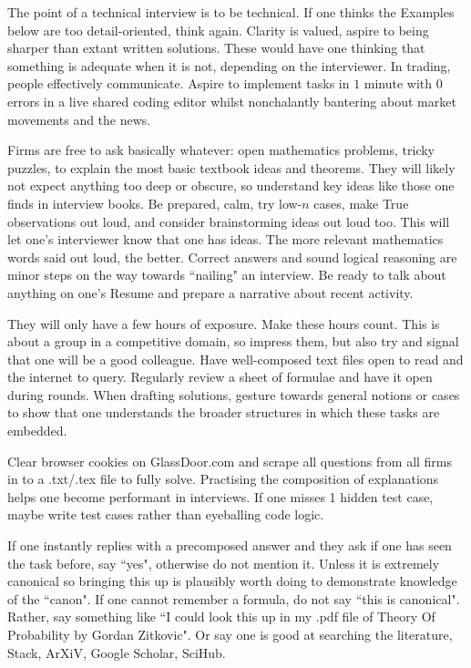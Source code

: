 The point of a technical interview is to be technical. If one thinks the Examples below are too detail-oriented, think again. Clarity is valued, aspire to being sharper than extant written solutions. These would have one thinking that something is adequate when it is not, depending on the interviewer. In trading, people effectively communicate. Aspire to implement tasks in $1$ minute with $0$ errors in a live shared coding editor whilst nonchalantly bantering about market movements and the news.

Firms are free to ask basically whatever: open mathematics problems, tricky puzzles, to explain the most basic textbook ideas and theorems. They will likely not expect anything too deep or obscure, so understand key ideas like those one finds in interview books. Be prepared, calm, try low-$n$ cases, make True observations out loud, and consider brainstorming ideas out loud too. This will let one's interviewer know that one has ideas. The more relevant mathematics words said out loud, the better. Correct answers and sound logical reasoning are minor steps on the way towards ``nailing" an interview. Be ready to talk about anything on one's Resume and prepare a narrative about recent activity.

They will only have a few hours of exposure. Make these hours count. This is about a group in a competitive domain, so impress them, but also try and signal that one will be a good colleague. Have well-composed text files open to read and the internet to query. Regularly review a sheet of formulae and have it open during rounds. When drafting solutions, gesture towards general notions or cases to show that one understands the broader structures in which these tasks are embedded.

Clear browser cookies on GlassDoor.com and scrape all questions from all firms in to a .txt/.tex file to fully solve. Practising the composition of explanations helps one become performant in interviews. If one misses 1 hidden test case, maybe write test cases rather than eyeballing code logic.

If one instantly replies with a precomposed answer and they ask if one has seen the task before, say ``yes", otherwise do not mention it. Unless it is extremely canonical so bringing this up is plausibly worth doing to demonstrate knowledge of the ``canon". If one cannot remember a formula, do not say ``this is canonical". Rather, say something like ``I could look this up in my .pdf file of Theory Of Probability by Gordan Zitkovic". Or say one is good at searching the literature, Stack, ArXiV, Google Scholar, SciHub.

